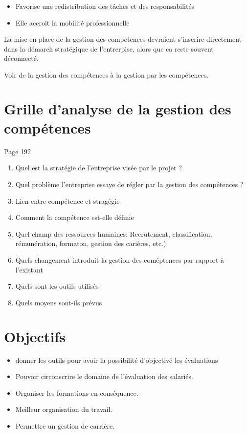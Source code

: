 \begin{itemize}
    \item Favorise une redistribution des tâches et des responsabilités
    \item Elle accroit la mobilité professionnelle
\end{itemize}




La mise en place de la gestion des compétences devraient s'inscrire directement dans la démarch stratégique de l'entrerpise, alors que ca reste souvent déconnecté. 

Voir de la gestion des compétences à la gestion par les compétences. 


\section{Grille d'analyse de la gestion des compétences}

Page 192
\begin{enumerate}
    \item Quel est la stratégie de l'entreprise visée par le projet ?
    \item Quel problème l'entreprise essaye de régler par la gestion des compétences ?
    \item Lien entre compétence et stragégie 
    \item Comment la compétence est-elle définie
    \item Quel champ des ressources humaines: Recrutement, classification, rémunération, formaton, gestion des carières, etc.)
    \item Quels changement introduit la gestion des coméptences par rapport à l'existant
    \item Quels sont les outils utilisés
    \item Quels moyens sont-ils prévus  
\end{enumerate}


\section{Objectifs}
\begin{itemize}
    \item donner les outils pour avoir la possibilité d'objectivé les évaluations
    \item Pouvoir circonscrire le domaine de l'évaluation des salariés. 
    \item Organiser les formations en conséquence. 
    \item Meilleur organisation du travail. 
    \item Permettre un gestion de carrière. 
\end{itemize}

